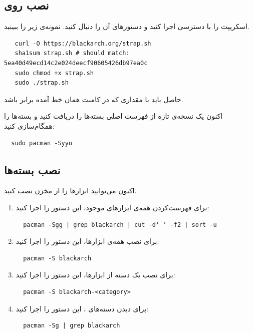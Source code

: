 \documentclass[a4paper, oneside, 11pt]{book}
\begin{document}
\subsection{نصب روی }
اسکریپت \href{https://blackarch.org/strap.sh}{} را با دسترسی  اجرا
کنید و دستورهای آن را دنبال کنید. نمونه‌ی زیر را ببینید.
\begin{latin}
\begin{lstlisting}
   curl -O https://blackarch.org/strap.sh
   sha1sum strap.sh # should match: 5ea40d49ecd14c2e024deecf90605426db97ea0c
   sudo chmod +x strap.sh
   sudo ./strap.sh
\end{lstlisting}
\end{latin}
حاصل  باید با مقداری که در کامنت همان خط آمده برابر باشد.

اکنون یک نسخه‌ی تازه از فهرست اصلی بسته‌ها را دریافت کنید و بسته‌ها را
همگام‌سازی کنید:
\begin{latin}
\begin{lstlisting}
  sudo pacman -Syyu
\end{lstlisting}
\end{latin}


\subsection{نصب بسته‌ها}
اکنون می‌توانید ابزارها را از مخزن  نصب کنید.
\begin{enumerate}
\item برای فهرست‌کردن همه‌ی ابزارهای موجود، این دستور را اجرا کنید:
\begin{latin}
\begin{lstlisting}
  pacman -Sgg | grep blackarch | cut -d' ' -f2 | sort -u
\end{lstlisting}
\end{latin}

\item برای نصب همه‌ی ابزارها، این دستور را اجرا کنید:
\begin{latin}
\begin{lstlisting}
  pacman -S blackarch
\end{lstlisting}
\end{latin}

\item برای نصب یک دسته از ابزارها، این دستور را اجرا کنید:
\begin{latin}
\begin{lstlisting}
  pacman -S blackarch-<category>
\end{lstlisting}
\end{latin}

\item برای دیدن دسته‌های ، این دستور را اجرا کنید:
\begin{latin}
\begin{lstlisting}
  pacman -Sg | grep blackarch
\end{lstlisting}
\end{latin}

\end{enumerate}
\end{document}
